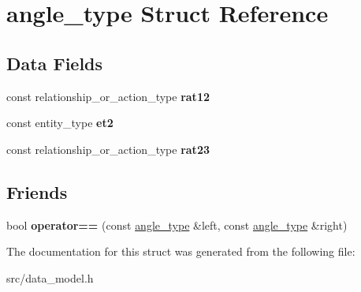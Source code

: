 \hypertarget{structangle__type}{}\section{angle\+\_\+type Struct Reference}
\label{structangle__type}
\subsection*{Data Fields}
\begin{DoxyCompactItemize}
\item 
\mbox{\label{structangle__type_a748f65a3ae97f3dba1cac69d40330f42}} 
const relationship\+\_\+or\+\_\+action\+\_\+type {\bfseries rat12}
\item 
\mbox{\label{structangle__type_a597582b9649e36a41e8f0a5e0ea50c66}} 
const entity\+\_\+type {\bfseries et2}
\item 
\mbox{\label{structangle__type_ad98ed08839b6c50759ae01fb72338cb9}} 
const relationship\+\_\+or\+\_\+action\+\_\+type {\bfseries rat23}
\end{DoxyCompactItemize}
\subsection*{Friends}
\begin{DoxyCompactItemize}
\item 
\mbox{\label{structangle__type_a259cbf4e32421b1e65066025fa86e999}} 
bool {\bfseries operator==} (const \hyperlink{structangle__type}{angle\+\_\+type} \&left, const \hyperlink{structangle__type}{angle\+\_\+type} \&right)
\end{DoxyCompactItemize}


The documentation for this struct was generated from the following file\+:\begin{DoxyCompactItemize}
\item 
src/data\+\_\+model.\+h\end{DoxyCompactItemize}
